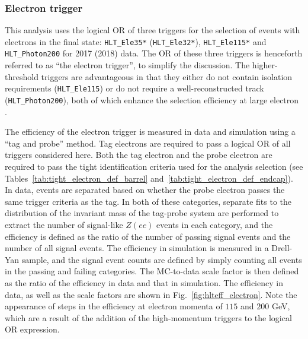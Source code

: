 \subsubsection{Electron trigger}

This analysis uses the logical OR of three triggers for the selection of events with electrons in the final state:
\texttt{HLT\_Ele35*} (\texttt{HLT\_Ele32*}),
\texttt{HLT\_Ele115*} and \texttt{HLT\_Photon200} for 2017 (2018) data. The OR of these three triggers is henceforth referred to as ``the electron trigger'',
to simplify the discussion. The higher-threshold triggers are advantageous in that they either do not contain isolation requirements (\texttt{HLT\_Ele115}) or do not require 
a well-reconstructed track (\texttt{HLT\_Photon200}), both of which enhance the selection efficiency at large electron \pt.

The efficiency of the electron trigger is measured in data and simulation using a ``tag and probe'' method. Tag electrons are required to pass a 
logical OR of all triggers considered here. Both the tag electron and the probe electron are required to pass the tight identification criteria used for the analysis 
selection (see Tables~\ref{tab:tight_electron_def_barrel} and~\ref{tab:tight_electron_def_endcap}). In data, events are separated based on whether the probe electron passes 
the same trigger criteria as the tag. In both of these categories, 
separate fits to the distribution of the invariant mass of the tag-probe system are performed to extract the number of signal-like $Z(ee)$ events in each category, 
and the efficiency is defined as the ratio of the number of passing signal events and the number of all signal events. The efficiency in simulation is 
measured in a Drell-Yan sample, and the signal event counts are defined by simply counting all events in the passing and failing categories. The MC-to-data scale 
factor is then defined as the ratio of the efficiency in data and that in simulation. The efficiency in data, as well as the scale factors are shown in 
Fig.~\ref{fig:hlteff_electron}. Note the appearance of steps in the efficiency at electron momenta of $115$ and $200$ GeV, which are a result of the addition 
of the high-momentum triggers to the logical OR expression.

